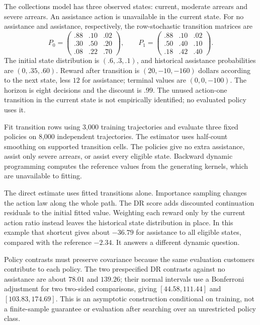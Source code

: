 The collections model has three observed states: current, moderate
arrears and severe arrears. An assistance action is unavailable in the
current state. For no assistance and assistance, respectively, the
row-stochastic transition matrices are
\[
 P_0=\begin{pmatrix}.88&.10&.02\\.30&.50&.20\\.08&.22&.70\end{pmatrix},
 \qquad
 P_1=\begin{pmatrix}.88&.10&.02\\.50&.40&.10\\.18&.42&.40\end{pmatrix}.
\]
The initial state distribution is $(.6,.3,.1)$, and historical assistance
probabilities are $(0,.35,.60)$. Reward after transition is
$(20,-10,-160)$ dollars according to the next state, less $12$ for
assistance; terminal values are $(0,0,-100)$. The horizon is eight
decisions and the discount is $.99$. The unused action-one transition
in the current state is not empirically identified; no evaluated policy
uses it.

Fit transition rows using 3,000 training trajectories and evaluate
three fixed policies on 8,000 independent trajectories. The estimator
uses half-count smoothing on supported transition cells. The policies
give no extra assistance, assist only severe arrears, or assist every
eligible state. Backward dynamic programming computes the reference
values from the generating kernels, which are unavailable to fitting.

\begin{table}[htbp]\centering\small

\caption{Values in synthetic dollars per trajectory. IPS uses cumulative
ratios; DR adds the continuation residuals. Final-weight ESS is a
diagnostic, not a general effective sample size for every estimator.}
\end{table}

The direct estimate uses fitted transitions alone. Importance sampling
changes the action law along the whole path. The DR score adds discounted
continuation residuals to the initial fitted value. Weighting each
reward only by the current action ratio instead leaves the historical
state distribution in place. In this example that shortcut gives about
$-36.79$ for assistance to all eligible states, compared with the
reference $-2.34$. It answers a different dynamic question.

Policy contrasts must preserve covariance because the same evaluation
customers contribute to each policy. The two prespecified DR contrasts
against no assistance are about $78.01$ and $139.26$; their normal
intervals use a Bonferroni adjustment for two two-sided comparisons,
giving $[44.58,111.44]$ and $[103.83,174.69]$. This is an asymptotic
construction conditional on training, not a finite-sample guarantee or
evaluation after searching over an unrestricted policy class.

